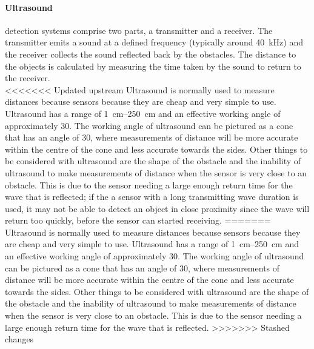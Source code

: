         \paragraph{Ultrasound} detection systems comprise two parts, a transmitter and a receiver. The transmitter emits a sound at a defined frequency (typically around \SI{40}{\kilo\hertz}) and the receiver collects the sound reflected back by the obstacles. The distance to the objects is calculated by measuring the time taken by the sound to return to the receiver.\\
<<<<<<< Updated upstream
        Ultrasound is normally used to measure distances because sensors because they are cheap and very simple to use. Ultrasound has a range of \SIrange{1}{250}{\centi\meter} and an effective working angle of approximately 30\dg.\cite{ultrasoundrobots} The working angle of ultrasound can be pictured as a cone that has an angle of 30\dg, where measurements of distance will be more accurate within the centre of the cone and less accurate towards the sides. Other things to be considered with ultrasound are the shape of the obstacle and the inability of ultrasound to make measurements of distance when the sensor is very close to an obstacle. This is due to the sensor needing a large enough return time for the wave that is reflected; if the a sensor with a long transmitting wave duration is used, it may not be able to detect an object in close proximity since the wave will return too quickly, before the sensor can started receiving.
=======
        Ultrasound is normally used to measure distances because sensors because they are cheap and very simple to use. Ultrasound has a range of \SIrange{1}{250}{\centi\meter} and an effective working angle of approximately 30\dg.\cite{ultrasoundrobots} The working angle of ultrasound can be pictured as a cone that has an angle of 30\dg, where measurements of distance will be more accurate within the centre of the cone and less accurate towards the sides. Other things to be considered with ultrasound are the shape of the obstacle and the inability of ultrasound to make measurements of distance when the sensor is very close to an obstacle. This is due to the sensor needing a large enough return time for the wave that is reflected.
>>>>>>> Stashed changes

